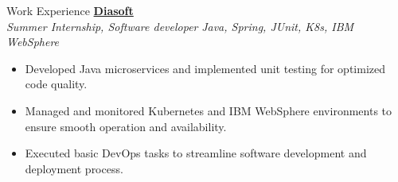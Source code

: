 \documentclass{resume} %
\begin{document}
\begin{rSection}{Work Experience}
{\bf \href{https://diasoft.com/}{Diasoft} } \hfill {} \;  
\\{\textit{ Summer Internship, Software developer }} \hfill {\textit{Java, Spring, JUnit, K8s, IBM WebSphere}}
\begin{itemize}
    \item Developed Java microservices and implemented unit testing for optimized code quality.
    \item Managed and monitored Kubernetes and IBM WebSphere environments to ensure smooth operation and availability.
    \item Executed basic DevOps tasks to streamline software development and deployment process.    
\end{itemize}

\end{rSection}
\end{document}
